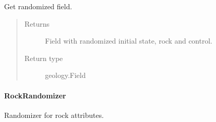 \documentclass[letterpaper,10pt,english]{sphinxmanual}
\begin{document}
\begin{fulllineitems}
\begin{fulllineitems}
\begin{quote}
\begin{description}
\begin{itemize}
\end{itemize}

\end{description}\end{quote}

\end{fulllineitems}


\begin{fulllineitems}
\label{\detokenize{api/randomizers:geology.datasets.FieldRandomizer.get_randomized_field}}
Get randomized field.
\begin{quote}\begin{description}
\item[{Returns}] \leavevmode
{} \textendash{} Field with randomized initial state, rock and control.

\item[{Return type}] \leavevmode
geology.Field

\end{description}\end{quote}

\end{fulllineitems}


\end{fulllineitems}



\paragraph{RockRandomizer}
\label{\detokenize{api/randomizers:rockrandomizer}}

\begin{fulllineitems}
\label{\detokenize{api/randomizers:geology.datasets.RockRandomizer}}
Randomizer for rock attributes.

\end{fulllineitems}
\end{document}
